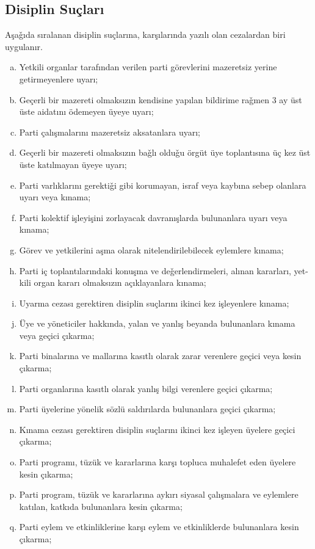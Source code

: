 \documentclass[11pt]{article} %
\begin{document}
\subsection{Disiplin Suçları}
Aşaǧıda sıralanan disiplin suçlarına, karşılarında yazılı olan cezalardan biri uygulanır.
\begin{enumerate}[a)]
\item Yetkili organlar tarafından verilen parti görevlerini mazeretsiz yerine getirmeyenlere uyarı;
\item Geçerli bir mazereti olmaksızın kendisine yapılan bildirime raǧmen 3 ay üst üste aidatını ödemeyen üyeye uyarı;
\item Parti çalışmalarını mazeretsiz aksatanlara uyarı;
\item Geçerli bir mazereti olmaksızın baǧlı olduǧu örgüt üye toplantısına üç kez üst üste katılmayan üyeye uyarı;
\item Parti varlıklarını gerektiǧi gibi korumayan, israf veya kaybına sebep olanlara
uyarı veya kınama;
\item Parti kolektif işleyişini zorlayacak davranışlarda bulunanlara uyarı veya kınama;
\item Görev ve yetkilerini aşma olarak nitelendirilebilecek eylemlere kınama;
\item Parti iç toplantılarındaki konuşma ve deǧerlendirmeleri, alınan kararları, yet-
kili organ kararı olmaksızın açıklayanlara kınama;
\item Uyarma cezası gerektiren disiplin suçlarını ikinci kez işleyenlere kınama;
\item  Üye ve yöneticiler hakkında, yalan ve yanlış beyanda bulunanlara kınama veya
geçici çıkarma;
\item Parti binalarına ve mallarına kasıtlı olarak zarar verenlere geçici veya kesin
çıkarma;
\item Parti organlarına kasıtlı olarak yanlış bilgi verenlere geçici çıkarma;
\item Parti üyelerine yönelik sözlü saldırılarda bulunanlara geçici çıkarma;
\item Kınama cezası gerektiren disiplin suçlarını ikinci kez işleyen üyelere geçici çıkarma;
\item Parti programı, tüzük ve kararlarına karşı topluca muhalefet eden üyelere
kesin çıkarma;
\item Parti program, tüzük ve kararlarına aykırı siyasal çalışmalara ve eylemlere katılan, katkıda bulunanlara kesin çıkarma;
\item Parti eylem ve etkinliklerine karşı eylem ve etkinliklerde bulunanlara kesin çıkarma;

\end{enumerate}
\end{document}

